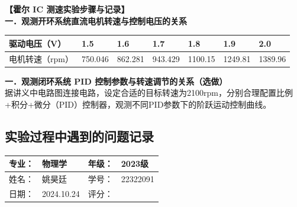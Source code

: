 \documentclass[dvipsnames, svgnames,a4paper,11pt]{article}
\begin{document}
\textbf{【霍尔 IC 测速实验步骤与记录】}\\
\textbf{一．观测开环系统直流电机转速与控制电压的关系}\\
\begin{table}[H]
	\renewcommand\arraystretch{1.7}
	\centering
	\begin{tabularx}{\textwidth}{|X|X|X|X|X|X|X|}
	\hline
	驱动电压（V）&1.5 &1.6&1.7&1.8&1.9&2.0\\
	\hline
	电机转速（rpm）&750.046&862.281&943.429&1100.15&1249.81&1389.96\\
	\hline
	\end{tabularx}
\end{table}
\textbf{一．观测闭环系统 PID 控制参数与转速调节的关系（选做）}\\
据讲义中电路图连接电路，设定合适的目标转速为{\color{red}2100rpm}，分别合理配置比例+积分+微分（PID）控制器，观测不同PID参数下的阶跃运动控制曲线。

\subsection{实验过程中遇到的问题记录}



\clearpage
{}
\begin{table}
	\renewcommand\arraystretch{1.7}
	\begin{tabularx}{\textwidth}{|X|X|X|X|}
	\hline
	专业：& 物理学 &年级：& 2023级\\
	\hline
	姓名： &姚昊廷 & 学号：& 22322091\\
	\hline
    日期：&2024.10.24 & 评分： &\\
	\hline
	\end{tabularx}
\end{table}
\end{document}
